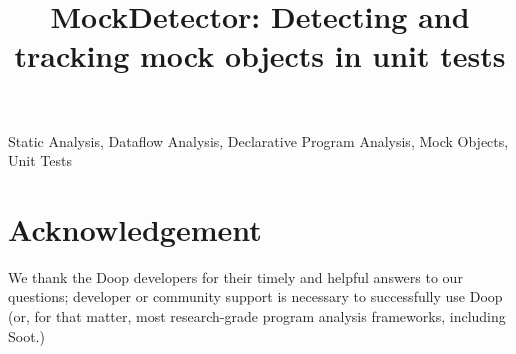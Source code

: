 \documentclass[conference]{IEEEtran}
\begin{document}

\title{MockDetector: Detecting and tracking mock objects in unit tests}


\maketitle



\begin{IEEEkeywords}
Static Analysis, Dataflow Analysis, Declarative Program Analysis, Mock Objects, Unit Tests
\end{IEEEkeywords}










\section*{Acknowledgement} We thank the Doop developers for their timely and helpful answers to our questions; developer or community support is necessary to successfully use Doop (or, for that matter, most research-grade program analysis frameworks, including Soot.)





%
\end{document}
